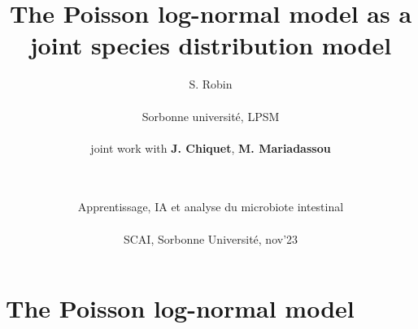 \documentclass[8pt]{beamer}
\begin{document}
\title[PLN as a JSDM]{The Poisson log-normal model as a joint species distribution model}

\author[S. Robin]{S. Robin \\ ~\\
  {\small Sorbonne universit\'e, LPSM} \\ ~\\
  joint work with {\bf J. Chiquet}, {\bf M. Mariadassou} \\ ~\\ ~\\
  \nocite{CMR18a,CMR19,CMR20,CMR21}}

\date[IA \& microbiote, SCAI, nov'23]{\small Apprentissage, IA et analyse du microbiote intestinal \\ 
  ~ \\ 
  SCAI, Sorbonne Universit\'e, nov'23}

\maketitle


\section{The Poisson log-normal model}
\end{document}
